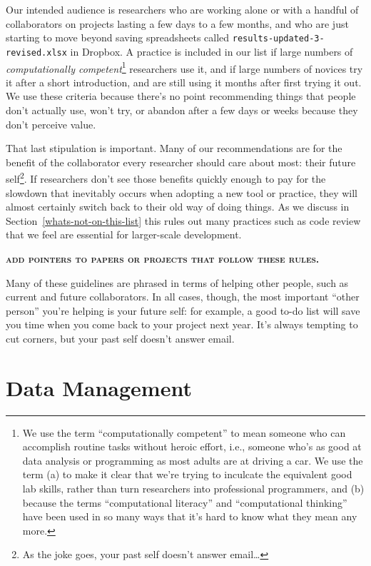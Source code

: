 \documentclass[10pt]{article}
\newcommand{\fixme}[1]{\textsc{\textbf{#1}}}
\begin{document}
Our intended audience is researchers who are working alone or with a
handful of collaborators on projects lasting a few days to a few
months, and who are just starting to move beyond saving spreadsheets
called \texttt{results-updated-3-revised.xlsx} in Dropbox. A practice
is included in our list if large numbers of \emph{computationally
  competent}\footnote{We use the term ``computationally competent'' to
  mean someone who can accomplish routine tasks without heroic effort,
  i.e., someone who's as good at data analysis or programming as most
  adults are at driving a car.  We use the term (a) to make it clear
  that we're trying to inculcate the equivalent good lab skills,
  rather than turn researchers into professional programmers, and (b)
  because the terms ``computational literacy'' and ``computational
  thinking'' have been used in so many ways that it's hard to know
  what they mean any more.} researchers use it, and if large numbers
of novices try it after a short introduction, and are still using it
months after first trying it out. We use these criteria because
there's no point recommending things that people don't actually use,
won't try, or abandon after a few days or weeks because they don't
perceive value.

That last stipulation is important. Many of our recommendations are
for the benefit of the collaborator every researcher should care about most:
their future self\footnote{As the joke goes, your past self doesn't
  answer email{\ldots}}. If researchers don't see those benefits
quickly enough to pay for the slowdown that inevitably occurs when
adopting a new tool or practice, they will almost certainly switch
back to their old way of doing things. As we discuss in
Section~\ref{whats-not-on-this-list} this rules out many practices
such as code review that we feel are essential for larger-scale
development.

\fixme{add pointers to papers or projects that follow these rules.}

Many of these guidelines are phrased in terms of helping other people,
such as current and future collaborators. In all cases, though, the
most important ``other person'' you're helping is your future self:
for example, a good to-do list will save you time when you come back
to your project next year. It's always tempting to cut corners, but
your past self doesn't answer email.

\section{Data Management}\label{data-management}
\end{document}
